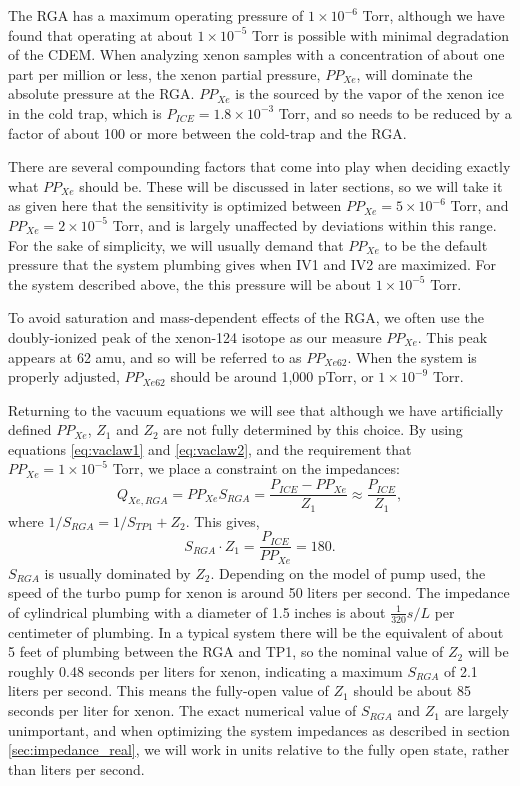 The RGA has a maximum operating pressure of $1\times 10^{-6}$ Torr, although we have found that operating at about $1\times 10^{-5}$ Torr is possible with minimal degradation of the CDEM. When analyzing xenon samples with a concentration of about one part per million or less, the xenon partial pressure, $PP_{Xe}$,  will dominate the absolute pressure at the RGA. $PP_{Xe}$ is the sourced by the vapor of the xenon ice in the cold trap, which is $P_{ICE}=1.8\times 10^{-3}$ Torr, and so needs to be reduced by a factor of about 100 or more between the cold-trap and the RGA\cite{vaporpressure}. 

There are several compounding factors that come into play when deciding exactly what $PP_{Xe}$ should be. These will be discussed in later sections, so we will take it as given here that the sensitivity is optimized between $PP_{Xe}=5\times10^{-6}$ Torr, and $PP_{Xe}=2\times10^{-5}$ Torr, and is largely unaffected by deviations within this range. For the sake of simplicity, we will usually demand that $PP_{Xe}$ to be the default pressure that the system plumbing gives when IV1 and IV2 are maximized. For the system described above, the this pressure will be about $1\times 10^{-5}$ Torr. 

To avoid saturation and mass-dependent effects of the RGA, we often use the doubly-ionized peak of the xenon-124 isotope as our measure $PP_{Xe}$. This peak appears at 62 amu, and so will be referred to as $PP_{Xe62}$. When the system is properly adjusted, $PP_{Xe62}$ should be around 1,000 pTorr, or $1\times 10^{-9}$ Torr.

Returning to the vacuum equations we will see that although we have artificially defined $PP_{Xe}$, $Z_1$ and $Z_2$ are not fully determined by this choice. By using equations \ref{eq:vaclaw1} and \ref{eq:vaclaw2}, and the requirement that $PP_{Xe}=1\times 10^{-5}$ Torr, we place a constraint on the impedances:
\begin{equation}
\label{eq:xepres1}
Q_{Xe,RGA}=PP_{Xe}S_{RGA}=\frac{P_{ICE}-PP_{Xe}}{Z_1}\approx \frac{P_{ICE}}{Z_1},
\end{equation}
where $1/S_{RGA}=1/S_{TP1}+Z_2$. This gives,
\begin{equation}
\label{eq:impconstraint}
S_{RGA}\cdot Z_1= \frac{P_{ICE}}{PP_{Xe}} = 180.
\end{equation}
$S_{RGA}$ is usually dominated by $Z_2$. Depending on the model of pump used, the speed of the turbo pump for xenon is around 50 liters per second. The impedance of cylindrical plumbing with a diameter of 1.5 inches is about $\frac{1}{320} s/L$ per centimeter of plumbing.\cite{vac_eq} In a typical system there will be the equivalent of about 5 feet of plumbing between the RGA and TP1, so the nominal value of $Z_2$ will be roughly 0.48 seconds per liters for xenon, indicating a maximum $S_{RGA}$ of 2.1 liters per second.\cite{vac_eq} This means the fully-open value of $Z_1$ should be about 85 seconds per liter for xenon. The exact numerical value of $S_{RGA}$ and $Z_1$ are largely unimportant, and when optimizing the system impedances as described in section \ref{sec:impedance_real}, we will work in units relative to the fully open state, rather than liters per second.



